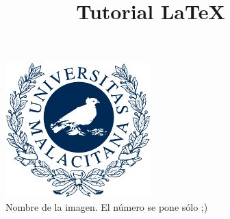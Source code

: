 \documentclass{article}
\title{Tutorial \LaTeX}
\begin{document}
%


\clearpage




\tableofcontents
\listoffigures

\newpage





\renewcommand{\headrulewidth}{0.5pt}

\rfoot[e1]{\thepage}
\renewcommand{\footrulewidth}{0.5pt}

\pagestyle{fancy} 

%
%

\begin{figure}[hbtp]
    \centering
	\includegraphics[width = 0.5\textwidth]{Images/logo_uma.pdf}
    \caption{Nombre de la imagen. El número se pone sólo ;)}
    \label{fig:prueba de otra imagen}
\end{figure}
\end{document}
